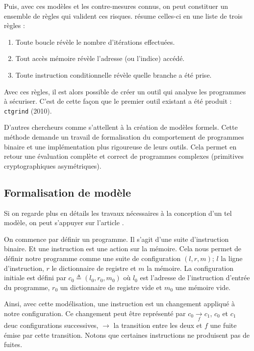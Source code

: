 Puis, avec ces modèles et les contre-mesures connus, on peut constituer un ensemble de règles qui valident ces risques. \cite{CTsaferCrypto} résume celles-ci en une liste de trois règles :
\begin{enumerate}
  \item Toute boucle révèle le nombre d'itérations effectuées. 
  \item Tout accès mémoire révèle l'adresse (ou l'indice) accédé.
  \item Toute instruction conditionnelle révèle quelle branche a été prise.
\end{enumerate}

Avec ces règles, il est alors possible de créer un outil qui analyse les programmes à sécuriser. C'est de cette façon que le premier outil existant a été produit : \texttt{ctgrind} (2010).\medbreak

D'autres chercheurs comme \citeauthor{binsecRel2019} \cite{binsecRel2019} s'attellent à la création de modèles formels. Cette méthode demande un travail de formalisation du comportement de programmes binaire et une implémentation plus rigoureuse de leurs outils. Cela permet en retour une évaluation complète et correct de programmes complexes (\ie primitives cryptographiques asymétriques).

\subsection*{Formalisation de modèle}

Si on regarde plus en détails les travaux nécessaires à la conception d'un tel modèle, on peut s'appuyer sur l'article  \cite{formalConstantTime}.\medbreak


On commence par définir un programme. Il s'agit d'une suite d'instruction binaire. Et une instruction est une action sur la mémoire. Cela nous permet de définir notre programme comme une suite de configuration $(l,r,m)$; $l$ la ligne d'instruction, $r$ le dictionnaire de registre et $m$ la mémoire. La configuration initiale est défini par $c_0 \triangleq (l_0,r_0,m_0)$ où $l_0$ est l'adresse de l'instruction d'entrée du programme, $r_0$ un dictionnaire de registre vide et $m_0$ une mémoire vide.\smallbreak

Ainsi, avec cette modélisation, une instruction est un changement appliqué à notre configuration. Ce changement peut être représenté par $ c_0 \underset{f}{\to} c_1 $, $c_0$ et $c_1$ deuc configurations successives, $\to$ la transition entre les deux et $f$ une fuite émise par cette transition. Notons que certaines instructions ne produisent pas de fuites.\smallbreak

